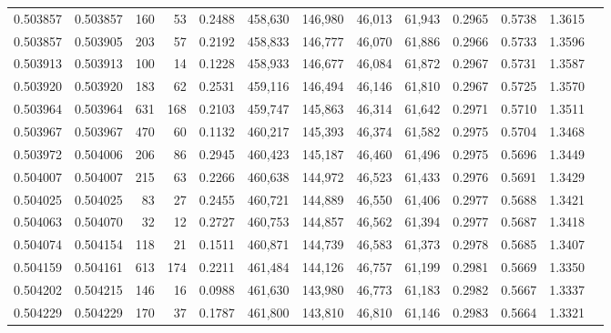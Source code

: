 \begin{tabular}{rrrrrrrrrrrrr}
0.503857 & 0.503857 &   160 &    53 &                                     0.2488 & 458,630 & 146,980 &  46,013 &  61,943 & 0.2965 & 0.5738 & 1.3615 \\
0.503857 & 0.503905 &   203 &    57 &                                     0.2192 & 458,833 & 146,777 &  46,070 &  61,886 & 0.2966 & 0.5733 & 1.3596 \\
0.503913 & 0.503913 &   100 &    14 &                                     0.1228 & 458,933 & 146,677 &  46,084 &  61,872 & 0.2967 & 0.5731 & 1.3587 \\
0.503920 & 0.503920 &   183 &    62 &                                     0.2531 & 459,116 & 146,494 &  46,146 &  61,810 & 0.2967 & 0.5725 & 1.3570 \\
0.503964 & 0.503964 &   631 &   168 &                                     0.2103 & 459,747 & 145,863 &  46,314 &  61,642 & 0.2971 & 0.5710 & 1.3511 \\
0.503967 & 0.503967 &   470 &    60 &                                     0.1132 & 460,217 & 145,393 &  46,374 &  61,582 & 0.2975 & 0.5704 & 1.3468 \\
0.503972 & 0.504006 &   206 &    86 &                                     0.2945 & 460,423 & 145,187 &  46,460 &  61,496 & 0.2975 & 0.5696 & 1.3449 \\
0.504007 & 0.504007 &   215 &    63 &                                     0.2266 & 460,638 & 144,972 &  46,523 &  61,433 & 0.2976 & 0.5691 & 1.3429 \\
0.504025 & 0.504025 &    83 &    27 &                                     0.2455 & 460,721 & 144,889 &  46,550 &  61,406 & 0.2977 & 0.5688 & 1.3421 \\
0.504063 & 0.504070 &    32 &    12 &                                     0.2727 & 460,753 & 144,857 &  46,562 &  61,394 & 0.2977 & 0.5687 & 1.3418 \\
0.504074 & 0.504154 &   118 &    21 &                                     0.1511 & 460,871 & 144,739 &  46,583 &  61,373 & 0.2978 & 0.5685 & 1.3407 \\
0.504159 & 0.504161 &   613 &   174 &                                     0.2211 & 461,484 & 144,126 &  46,757 &  61,199 & 0.2981 & 0.5669 & 1.3350 \\
0.504202 & 0.504215 &   146 &    16 &                                     0.0988 & 461,630 & 143,980 &  46,773 &  61,183 & 0.2982 & 0.5667 & 1.3337 \\
0.504229 & 0.504229 &   170 &    37 &                                     0.1787 & 461,800 & 143,810 &  46,810 &  61,146 & 0.2983 & 0.5664 & 1.3321 \\

\end{tabular}
